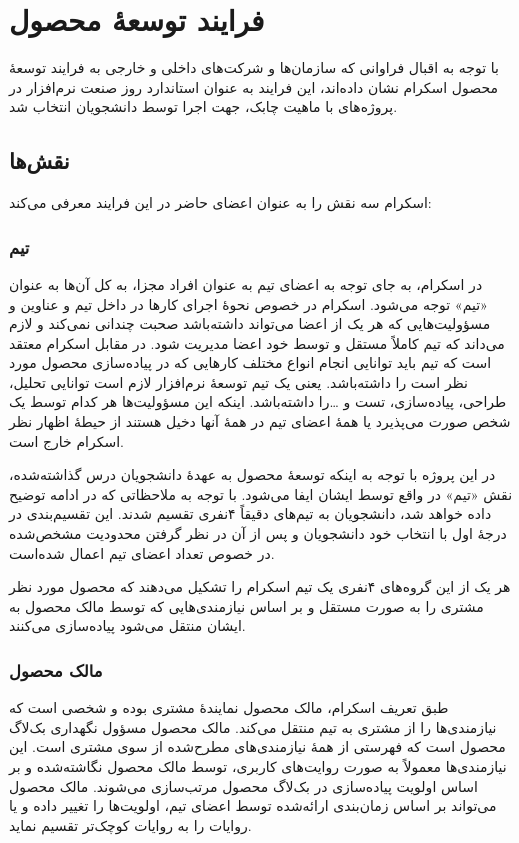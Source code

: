 \documentclass[a4paper,notitlepage]{report}
\begin{document}
\section{فرایند توسعهٔ محصول}
با توجه به اقبال فراوانی که سازمان‌ها و شرکت‌های داخلی و خارجی به فرایند توسعهٔ محصول اسکرام نشان داده‌اند،
این فرایند به عنوان استاندارد روز صنعت نرم‌افزار در پروژه‌های با ماهیت چابک، جهت اجرا توسط دانشجویان انتخاب شد.
\subsection{نقش‌ها}
اسکرام سه نقش را به عنوان اعضای حاضر در این فرایند معرفی می‌کند:
\subsubsection{تیم}
در اسکرام، به جای توجه به اعضای تیم به عنوان افراد مجزا، به کل آن‌ها به عنوان «تیم» توجه می‌شود.
اسکرام در خصوص نحوهٔ اجرای کارها در داخل تیم و عناوین و مسؤولیت‌هایی که هر یک از اعضا می‌تواند داشته‌باشد صحبت چندانی نمی‌کند
و لازم می‌داند که تیم کاملاً مستقل و توسط خود اعضا مدیریت شود.
در مقابل اسکرام معتقد است که تیم باید توانایی انجام انواع مختلف کارهایی که در پیاده‌سازی محصول مورد نظر است را داشته‌باشد.
یعنی یک تیم توسعهٔ نرم‌افزار لازم است توانایی تحلیل، طراحی، پیاده‌سازی، تست و \ldots را داشته‌باشد.
اینکه این مسؤولیت‌ها هر کدام توسط یک شخص صورت می‌پذیرد یا همهٔ اعضای تیم در همهٔ آنها دخیل هستند از حیطهٔ اظهار نظر اسکرام خارج است.

در این پروژه با توجه به اینکه توسعهٔ محصول به عهدهٔ دانشجویان درس گذاشته‌شده، نقش «تیم» در واقع توسط ایشان ایفا می‌شود.
با توجه به ملاحظاتی که در ادامه توضیح داده خواهد شد، دانشجویان به تیم‌های دقیقاً ۴نفری تقسیم شدند.
این تقسیم‌بندی در درجهٔ اول با انتخاب خود دانشجویان و پس از آن در نظر گرفتن محدودیت مشخص‌شده در خصوص تعداد اعضای تیم اعمال شده‌است.

هر یک از این گروه‌های ۴نفری یک تیم اسکرام را تشکیل می‌دهند که محصول مورد نظر مشتری را به صورت مستقل و بر اساس نیازمندی‌هایی که توسط مالک محصول
به ایشان منتقل می‌شود پیاده‌سازی می‌کنند.
\subsubsection{مالک محصول}
طبق تعریف اسکرام، مالک محصول نمایندهٔ مشتری بوده و شخصی است که نیازمندی‌ها را از مشتری به تیم منتقل می‌کند.
مالک محصول مسؤول نگهداری بک‌لاگ محصول است که فهرستی از همهٔ نیازمندی‌های مطرح‌شده از سوی مشتری است.
این نیازمندی‌ها معمولاً به صورت روایت‌های کاربری، توسط مالک محصول نگاشته‌شده و بر اساس اولویت پیاده‌سازی در بک‌لاگ محصول مرتب‌سازی می‌شوند.
مالک محصول می‌تواند بر اساس زمان‌بندی ارائه‌شده توسط اعضای تیم، اولویت‌ها را تغییر داده و یا روایات را به روایات کوچک‌تر تقسیم نماید.
\end{document}
